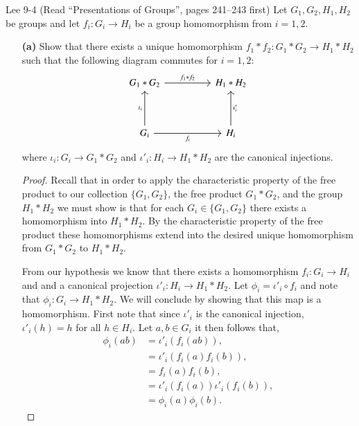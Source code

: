 \documentclass{homework651}
\begin{document}
\begin{problems}
    \problem Lee 9-4 (Read ``Presentations of Groups'', pages 241--243 first)
    Let $G_1, G_2, H_1, H_2$ be groups and let $f_i: G_i \to H_i$ be a group homomorphism from $i = 1, 2$. 
    \begin{enumerate}
        \item[\textbf{(a)}] Show that there exists a unique homomorphism $f_1 \ast  f_2: G_1 \ast  G_2 \to H_1 \ast H_2$
        such that the following diagram commutes for $i = 1, 2$:
        \[\begin{tikzcd}
            {G_1 \ast G_2} && {H_1 \ast H_2} \\
            \\
            {G_i} && {H_i}
            \arrow["{f_i}"', from=3-1, to=3-3]
            \arrow["{\iota_i}", from=3-1, to=1-1]
            \arrow["{\iota'_i}"', from=3-3, to=1-3]
            \arrow["{f_1\ast f_2}", from=1-1, to=1-3]
        \end{tikzcd}\]
        where $\iota_i: G_i \to G_1 \ast G_2$ and $\iota'_i: H_i \to H_1 \ast H_2$ are the canonical injections. 
        \begin{proof} Recall that in order to apply the characteristic property of the free product to our collection $\{G_1, G_2\}$,
            the free product $G_1 \ast G_2$, and the group $H_1 \ast H_2$ we must show is that for each $G_i \in \{G_1, G_2\}$
            there exists a homomorphism into $H_1 \ast H_2$. By the characteristic property of the free product these homomorphisms
            extend into the desired unique homomorphism from $G_1 \ast G_2$ to $H_1 \ast H_2$.

            From our hypothesis we know that there exists a homomorphism $f_i: G_i \to H_i$ and and a canonical projection $\iota'_i: H_i \to H_1 \ast H_2$.
            Let $\phi_i = \iota'_i \circ f_i$ and note that $\phi_i :G_i \to  H_1 \ast H_2$. We will conclude by showing that this map is a homomorphism. First note 
            that since $\iota'_i$ is the canonical injection, $\iota'_i(h) = h$ for all $h \in H_i$.  
            Let $a, b \in G_i$ it then follows that, 
            \begin{align*}
                \phi_i(ab) &= \iota'_i(f_i(ab)),\\
                &= \iota'_i(f_i(a)f_i(b)),\\
                &= f_i(a)f_i(b),\\
                &= \iota'_i(f_i(a))\iota'_i(f_i(b)),\\
                &= \phi_i(a)\phi_i(b).
            \end{align*}
        \end{proof}
            \vspace*{.15in}
   

\end{enumerate}
\end{problems}
\end{document}
